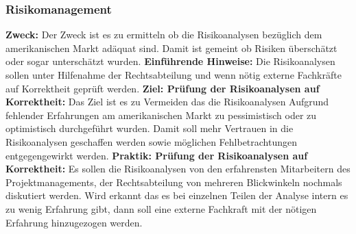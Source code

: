 \subsubsection{Risikomanagement}
\textbf{Zweck:}
\newline
Der Zweck ist es zu ermitteln ob die Risikoanalysen bezüglich dem amerikanischen Markt adäquat sind. Damit ist gemeint ob Risiken überschätzt oder sogar unterschätzt wurden.
\newline
\newline
\textbf{Einführende Hinweise:}
\newline
Die Risikoanalysen sollen unter Hilfenahme der Rechtsabteilung und wenn nötig externe Fachkräfte auf Korrektheit geprüft werden. 
\newline
\newline
\textbf{Ziel: Prüfung der Risikoanalysen auf Korrektheit:}
\newline
Das Ziel ist es zu Vermeiden das die Risikoanalysen Aufgrund fehlender Erfahrungen am amerikanischen Markt zu pessimistisch oder zu optimistisch durchgeführt wurden. Damit soll mehr Vertrauen in die Risikoanalysen geschaffen werden sowie möglichen Fehlbetrachtungen entgegengewirkt werden.
\newline
\newline
\textbf{Praktik: Prüfung der Risikoanalysen auf Korrektheit:}
\newline
Es sollen die Risikoanalysen von den erfahrensten Mitarbeitern des Projektmanagements, der Rechtsabteilung von mehreren Blickwinkeln nochmals diskutiert werden. Wird erkannt das es bei einzelnen Teilen der Analyse intern es zu wenig Erfahrung gibt, dann soll eine externe Fachkraft mit der nötigen Erfahrung hinzugezogen werden.
\newpage

